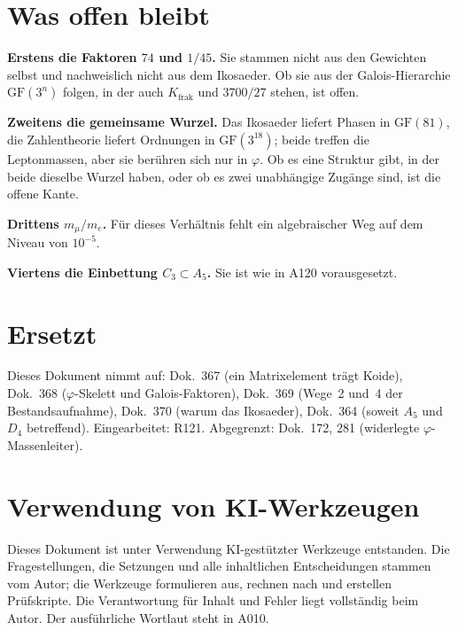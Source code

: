 \section{Was offen bleibt}

\textbf{Erstens die Faktoren $74$ und $1/45$.} Sie stammen nicht aus den
Gewichten selbst und nachweislich nicht aus dem Ikosaeder. Ob sie aus der
Galois-Hierarchie $\mathrm{GF}(3^n)$ folgen, in der auch $K_\text{frak}$ und
$3700/27$ stehen, ist offen.

\textbf{Zweitens die gemeinsame Wurzel.} Das Ikosaeder liefert Phasen in
$\mathrm{GF}(81)$, die Zahlentheorie liefert Ordnungen in
$\mathrm{GF}(3^{18})$; beide treffen die Leptonmassen, aber sie berühren
sich nur in $\varphi$. Ob es eine Struktur gibt, in der beide dieselbe Wurzel
haben, oder ob es zwei unabhängige Zugänge sind, ist die offene Kante.

\textbf{Drittens $m_\mu/m_e$.} Für dieses Verhältnis fehlt ein algebraischer
Weg auf dem Niveau von $10^{-5}$.

\textbf{Viertens die Einbettung $C_3\subset A_5$.} Sie ist wie in A120
vorausgesetzt.

\section{Ersetzt}

Dieses Dokument nimmt auf: Dok.~367 (ein Matrixelement trägt Koide),
Dok.~368 ($\varphi$-Skelett und Galois-Faktoren), Dok.~369 (Wege~2 und~4 der
Bestandsaufnahme), Dok.~370 (warum das Ikosaeder), Dok.~364 (soweit $A_5$ und
$D_4$ betreffend). Eingearbeitet: R121. Abgegrenzt: Dok.~172, 281 (widerlegte
$\varphi$-Massenleiter).

\section{Verwendung von KI-Werkzeugen}

Dieses Dokument ist unter Verwendung KI-gestützter Werkzeuge entstanden. Die
Fragestellungen, die Setzungen und alle inhaltlichen Entscheidungen stammen vom
Autor; die Werkzeuge formulieren aus, rechnen nach und erstellen Prüfskripte.
Die Verantwortung für Inhalt und Fehler liegt vollständig beim Autor. Der
ausführliche Wortlaut steht in A010.
